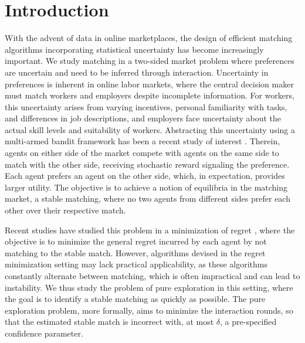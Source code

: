 \documentclass{article}
\begin{document}
\section{Introduction}
With the advent of data in online marketplaces, the design of efficient matching algorithms incorporating statistical uncertainty has become increasingly important. We study matching in a two-sided market problem where preferences are uncertain and need to be inferred through interaction. Uncertainty in preferences is inherent in online labor markets, where the central decision maker must match workers and employers despite incomplete information. For workers, this uncertainty arises from varying incentives, personal familiarity with tasks, and differences in job descriptions, and employers face uncertainty about the actual skill levels and suitability of workers. Abstracting this uncertainty using a multi-armed bandit framework has been a recent study of interest \cite{liu2020competing,soda,shah}. Therein, agents on either side of the market compete with agents on the same side to match with the other side, receiving stochastic reward signaling the preference. Each agent prefers an agent on the other side, which, in expectation, provides larger utility. The objective is to achieve a notion of equilibria in the matching market, a stable matching,  where no two agents from different sides prefer each other over their respective match. 


Recent studies have studied this problem in a minimization of regret \cite{liu2020competing}, where the objective is to minimize the general regret incurred by each agent by not matching to the stable match. However, algorithms devised in the regret minimization setting may lack practical applicability, as these algorithms constantly alternate between matching, which is often impractical and can lead to instability. We thus study the problem of pure exploration in this setting, where the goal is to identify a stable matching as quickly as possible. The pure exploration problem, more formally, aims to minimize the interaction rounds, so that the estimated stable match is incorrect with, at most $\delta$, a pre-specified confidence parameter. 
\end{document}
